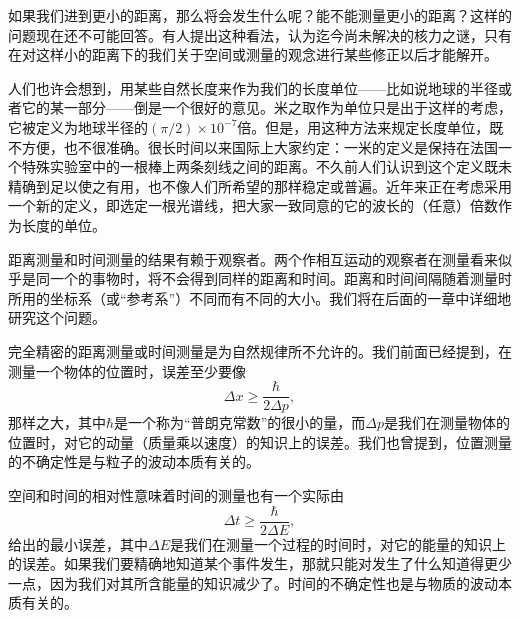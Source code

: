 \normalsize
如果我们进到更小的距离，那么将会发生什么呢？能不能测量更小的距离？这样的问题现在还不可能回答。有人提出这种看法，认为迄今尚未解决的核力之谜，只有在对这样小的距离下的我们关于空间或测量的观念进行某些修正以后才能解开。

人们也许会想到，用某些自然长度来作为我们的长度单位——比如说地球的半径或者它的某一部分——倒是一个很好的意见。米之取作为单位只是出于这样的考虑，它被定义为地球半径的$(\pi/2)\times10^{-7}$倍。但是，用这种方法来规定长度单位，既不方便，也不很准确。很长时间以来国际上大家约定：一米的定义是保持在法国一个特殊实验室中的一根棒上两条刻线之间的距离。不久前人们认识到这个定义既未精确到足以使之有用，也不像人们所希望的那样稳定或普遍。近年来正在考虑采用一个新的定义，即选定一根光谱线，把大家一致同意的它的波长的（任意）倍数作为长度的单位。

距离测量和时间测量的结果有赖于观察者。两个作相互运动的观察者在测量看来似乎是同一个的事物时，将不会得到同样的距离和时间。距离和时间间隔随着测量时所用的坐标系（或“参考系”）不同而有不同的大小。我们将在后面的一章中详细地研究这个问题。

完全精密的距离测量或时间测量是为自然规律所不允许的。我们前面已经提到，在测量一个物体的位置时，误差至少要像
\begin{equation*}
\Delta x\geq\frac{\hbar}{2\Delta p},
\end{equation*}
那样之大，其中$\hbar$是一个称为“普朗克常数”的很小的量，而$\Delta p$是我们在测量物体的位置时，对它的动量（质量乘以速度）的知识上的误差。我们也曾提到，位置测量的不确定性是与粒子的波动本质有关的。

空间和时间的相对性意味着时间的测量也有一个实际由
\begin{equation*}
\Delta t\geq\frac{\hbar}{2\Delta E},
\end{equation*}
给出的最小误差，其中$\Delta E$是我们在测量一个过程的时间时，对它的能量的知识上的误差。如果我们要精确地知道某个事件发生，那就只能对发生了什么知道得更少一点，因为我们对其所含能量的知识减少了。时间的不确定性也是与物质的波动本质有关的。
